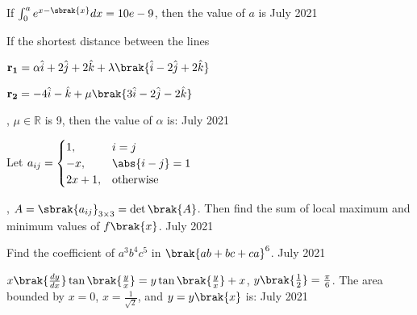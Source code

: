 \iffalse
   \title{Assignment}
   \author{EE24BTECH11034}
   \section{integer}
\fi 
        
        
    \item If $\int_0^a e^{x - \sbrak{x}} dx = 10e - 9$, then the value of $a$ is     \hfill{July 2021}
      

    \item If the shortest distance between the lines

        $\mathbf{r_1} = \alpha \hat{i} + 2 \hat{j} + 2 \hat{k} + \lambda \brak{\hat{i} - 2 \hat{j} + 2 \hat{k}}$
        
        
        $\mathbf{r_2} = -4 \hat{i} - \hat{k} + \mu \brak{3 \hat{i} - 2 \hat{j} - 2 \hat{k}}$
        
        , $\mu \in \mathbb{R}$ is 9, then the value of $\alpha$ is: \hfill{July 2021}
        
       
        
    \item Let $a_{ij} = \begin{cases}
        1, & i = j \\
        -x, & \abs{i - j} = 1 \\
        2x + 1, & \text{otherwise}
        \end{cases}$
        
        , $A = \sbrak{a_{ij}}_{3 \times 3} = \det\brak{A}$. Then find the sum of local maximum and minimum values of $f\brak{x}$. \hfill{July 2021}
        
        

    \item Find the coefficient of $a^3b^4c^5$ in $\brak{ab + bc + ca}^6$. \hfill{July 2021}
        
       
        
    
     \item $x \brak{\frac{dy}{dx}} \tan\brak{\frac{y}{x}} = y \tan\brak{\frac{y}{x}} + x$, $y\brak{\frac{1}{2}} = \frac{\pi}{6}$. The area bounded by $x = 0$, $x = \frac{1}{\sqrt{2}}$, and $y = y\brak{x}$ is: \hfill{July 2021}
    
       

